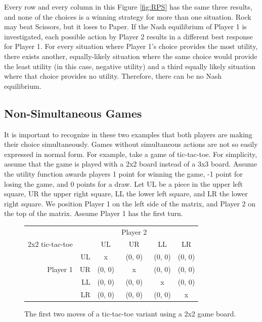 Every row and every column in this Figure \ref{fig:RPS} has the same three results, and none of the choices is a winning strategy for more than one situation. Rock may beat Scissors, but it loses to Paper. If the Nash equilibrium of Player 1 is investigated, each possible action by Player 2 results in a different best response for Player 1. For every situation where Player 1's choice provides the most utility, there exists another, equally-likely situation where the same choice would provide the least utility (in this case, negative utility) and a third equally likely situation where that choice provides no utility. Therefore, there can be no Nash equilibrium.\\



\subsection{Non-Simultaneous Games}
It is important to recognize in these two examples that both players are making their choice simultaneously. Games without simultaneous actions are not so easily expressed in normal form. For example, take a game of tic-tac-toe. For simplicity, assume that the game is played with a 2x2 board instead of a 3x3 board. Assume the utility function awards players 1 point for winning the game, -1 point for losing the game, and 0 points for a draw. Let UL be a piece in the upper left square, UR the upper right square, LL the lower left square, and LR the lower right square. We position Player 1 on the left side of the matrix, and Player 2 on the top of the matrix. Assume Player 1 has the first turn.\\
\begin{figure}[H]
  \centering
  \begin{tabular}{r r | c | c | c | c |}
    &\multicolumn{1}{c}{}&\multicolumn{1}{c}{}&\multicolumn{1}{c}{Player 2}&\multicolumn{1}{c}{}\\
    \multicolumn{1}{c}{2x2 tic-tac-toe}&\multicolumn{1}{c}{}&\multicolumn{1}{c}{UL}&
    \multicolumn{1}{c}{UR}&\multicolumn{1}{c}{LL}&\multicolumn{1}{c}{LR}\\ \cline{3-6}
    & UL & x & (0, 0) & (0, 0) & (0, 0) \\ \cline{3-6}
    Player 1 & UR & (0, 0) & x & (0, 0) & (0, 0) \\ \cline{3-6}
    & LL & (0, 0) & (0, 0) & x & (0, 0) \\ \cline{3-6}
    & LR & (0, 0) & (0, 0) & (0, 0) & x \\ \cline{3-6}
  \end{tabular}
  \caption{The first two moves of a tic-tac-toe variant using a 2x2 game board.}
  \label{fig:2x2TTT}
\end{figure}

